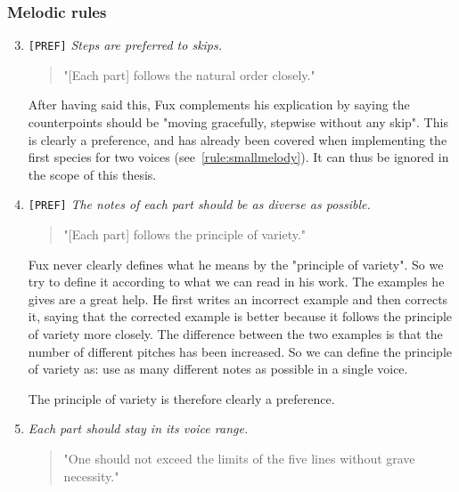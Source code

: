\subsubsection{Melodic rules}
\begin{enumerate}[wide, label=\bfseries 1.M\arabic*]
\setcounter{enumi}{2} %
    \item\label{rule:steps-prefered} \texttt{[PREF]} \textit{Steps are preferred to skips.}

    \begin{quotation}
    "[Each part] follows the natural order closely."
    \textcite[p.73]{GaPEng}
    \end{quotation}

    After having said this, Fux complements his explication by saying the counterpoints should be "moving gracefully, stepwise without any skip". This is clearly a preference, and has already been covered when implementing the first species for two voices (see~\ref{rule:smallmelody}). It can thus be ignored in the scope of this thesis.

    \item\label{rule:variety} \texttt{[PREF]}  \textit{The notes of each part should be as diverse as possible.}

    \begin{quotation}
    "[Each part] follows the principle of variety."
    \textcite[p.73]{GaPEng}
    \end{quotation}

    Fux never clearly defines what he means by the "principle of variety". So we try to define it according to what we can read in his work. The examples he gives are a great help. He first writes an incorrect example and then corrects it, saying that the corrected example is better because it follows the principle of variety more closely. The difference between the two examples is that the number of different pitches has been increased. So we can define the principle of variety as: use as many different notes as possible in a single voice. 

    The principle of variety is therefore clearly a preference.

    \item\label{rule:each-part-should-stay-in-its-voice-range}  \textit{Each part should stay in its voice range.}

    \begin{quotation}
    "One should not exceed the limits of the five lines without grave necessity."
    \textcite[p.79]{GaPEng}
    \end{quotation}


\end{enumerate}
